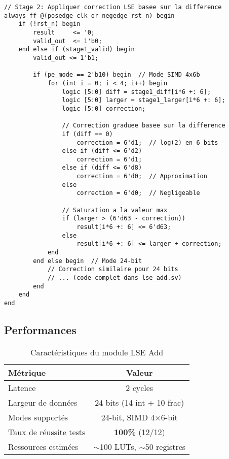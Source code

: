 \documentclass[12pt,a4paper]{article}
\begin{document}
\begin{lstlisting}[style=verilog, caption={Stage 2 : Application de la correction logarithmique}]
// Stage 2: Appliquer correction LSE basee sur la difference
always_ff @(posedge clk or negedge rst_n) begin
    if (!rst_n) begin
        result     <= '0;
        valid_out  <= 1'b0;
    end else if (stage1_valid) begin
        valid_out <= 1'b1;
        
        if (pe_mode == 2'b10) begin  // Mode SIMD 4x6b
            for (int i = 0; i < 4; i++) begin
                logic [5:0] diff = stage1_diff[i*6 +: 6];
                logic [5:0] larger = stage1_larger[i*6 +: 6];
                logic [5:0] correction;
                
                // Correction graduee basee sur la difference
                if (diff == 0)
                    correction = 6'd1;  // log(2) en 6 bits
                else if (diff <= 6'd2)
                    correction = 6'd1;
                else if (diff <= 6'd8)
                    correction = 6'd0;  // Approximation
                else
                    correction = 6'd0;  // Negligeable
                
                // Saturation a la valeur max
                if (larger > (6'd63 - correction))
                    result[i*6 +: 6] <= 6'd63;
                else
                    result[i*6 +: 6] <= larger + correction;
            end
        end else begin  // Mode 24-bit
            // Correction similaire pour 24 bits
            // ... (code complet dans lse_add.sv)
        end
    end
end
\end{lstlisting}

\subsection{Performances}

\begin{table}[h]
\centering
\caption{Caractéristiques du module LSE Add}
\begin{tabular}{|l|c|}
\hline
\textbf{Métrique} & \textbf{Valeur} \\
\hline
Latence & 2 cycles \\
Largeur de données & 24 bits (14 int + 10 frac) \\
Modes supportés & 24-bit, SIMD 4×6-bit \\
Taux de réussite tests & \textbf{100\%} (12/12) \\
Ressources estimées & $\sim$100 LUTs, $\sim$50 registres \\
\hline
\end{tabular}
\end{table}
\end{document}
